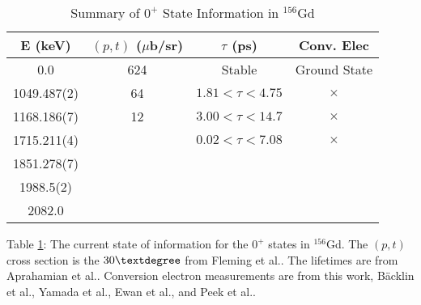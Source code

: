 \begin{table}
    \centering
\begin{threeparttable}
    \centering
    \caption{Summary of $0^+$ State Information in $^{156}$Gd}
    \label{tab:156gd_summary}
    \begin{tabular}{c|c|c|c}
        E (keV) & $(p,t)$ ($\mu$b/sr) & $\tau$ (ps)\citep{aprahamian18:_156gd} & Conv. Elec \\
        \toprule
        0.0 & 624 & Stable & Ground State \\
        1049.487(2) & 64 & $1.81<\tau<4.75$ & $\times$ \\
        1168.186(7) & 12 & $3.00<\tau<14.7$ &  $\times$ \\
        1715.211(4) &  & $0.02<\tau<7.08$ & $\times$ \\
        1851.278(7) &  & & \\
        1988.5(2) &  & &  \\
        2082.0 &  & &  \\
        \bottomrule
    \end{tabular}
    \begin{tablenotes}[para]
        Table \ref{tab:156gd_summary}: The current state of information for the $0^+$ states in $^{156}$Gd. The $(p,t)$ cross section is the $30\textdegree$ from Fleming et al.\citep{fleming73:_156gd}. The lifetimes are from Aprahamian et al.\citep{aprahamian18:_156gd}. Conversion electron measurements are from this work, B{\"a}cklin et al.\citep{backlin82:_156Gd}, Yamada et al.\citep{yamada76:_156gd}, Ewan et al.\citep{ewan62:_156gd}, and Peek et al.\citep{Peek64:_156gd}.
    \end{tablenotes}
\end{threeparttable}
\end{table}
